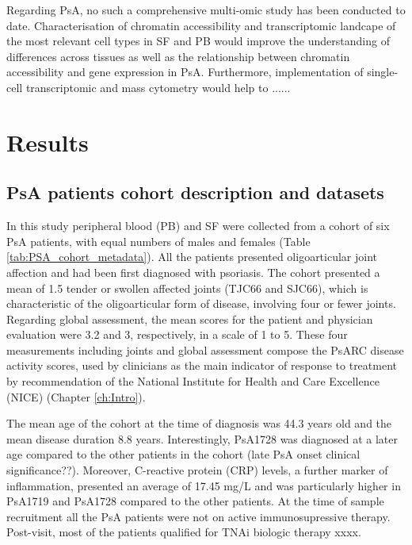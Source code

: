 Regarding PsA, no such a comprehensive multi-omic study has been conducted to date. Characterisation of chromatin accessibility and transcriptomic landcape of the most relevant cell types in SF and PB would improve the understanding of differences across tissues as well as the relationship between chromatin accessibility and gene expression in PsA. Furthermore, implementation of single-cell transcriptomic and mass cytometry would help to  ......



\section{Results}
%

\subsection{PsA patients cohort description and datasets}
In this study peripheral blood (PB) and SF were collected from a cohort of six PsA patients, with equal numbers of males and females (Table \ref{tab:PSA_cohort_metadata}). All the patients presented oligoarticular joint affection and had been first diagnosed with psoriasis. The cohort presented a mean of 1.5 tender or swollen affected joints (TJC66 and SJC66), which is characteristic of the oligoarticular form of disease, involving four or fewer joints. Regarding global assessment, the mean scores for the patient and physician evaluation were 3.2 and 3, respectively, in a scale of 1 to 5. These four measurements including joints and global assessment compose the PsARC disease activity scores, used by clinicians as the main indicator of response to treatment by recommendation of the National Institute for Health and Care Excellence (NICE) (Chapter \ref{ch:Intro}). 

The mean age of the cohort at the time of diagnosis was 44.3 years old and the mean disease duration 8.8 years. Interestingly, PsA1728 was diagnosed at a later age compared to the other patients in the cohort (late PsA onset clinical significance??). Moreover, C-reactive protein (CRP) levels, a further marker of inflammation, presented an average of 17.45 mg/L and was particularly higher in PsA1719 and PsA1728 compared to the other patients. At the time of sample recruitment all the PsA patients were not on active immunosupressive therapy. Post-visit, most of the patients qualified for TNAi biologic therapy xxxx.


